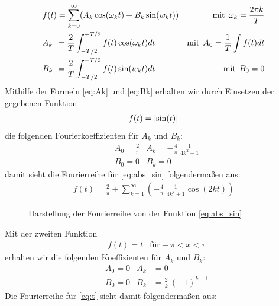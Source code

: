     \begin{align}   %
        &f(t) = \sum_{k=0}^{\infty} (A_k \cos(\omega_kt) + B_k \sin(w_kt))  &\text{mit} \:\: \omega_k = \frac{2\pi k}{T} \label{eq:frow}\\
        &A_k \hphantom{)} = \frac{2}{T} \int_{-T/2}^{+T/2} f(t) \cos(\omega_kt) dt  &\text{mit} \:\: A_0 = \frac{1}{T} \int f(t)dt \label{eq:Ak}\\
        &B_k \hphantom{)} = \frac{2}{T} \int_{-T/2}^{+T/2} f(t) \sin(w_kt) dt \!\!&\text{mit} \:\: B_0 = 0 \label{eq:Bk}
    \end{align}
    Mithilfe der Formeln \eqref{eq:Ak} und \eqref{eq:Bk} erhalten wir durch Einsetzen der gegebenen Funktion
    \begin{align}
        f(t) = \lvert\sin(t)\rvert \label{eq:abs_sin} 
    \end{align}
    die folgenden Fourierkoeffizienten für $A_k$ und $B_k$:
    \begin{align*}
        &A_0 = \frac{2}{\pi} &A_k = -\frac{4}{\pi}\:\frac{1}{4k^{2}-1}\\
        &B_0 = 0 &B_k = 0
    \end{align*}
    damit sieht die Fourierreihe für \eqref{eq:abs_sin} folgendermaßen aus:
    \begin{align}
        f(t)=\frac{2}{\pi}+\sum_{k=1}^{\infty} \left(-\frac{4}{\pi} \:\frac{1}{4k^2+1} \cos(2kt)\right)
    \end{align}
    \begin{figure}[h]
         \centering
           \vspace{-1.5em}
         \caption{Darstellung der Fourierreihe von der Funktion \eqref{eq:abs_sin}}
         \label{fig:sc_sin} 
    \end{figure}
    \newpage
    Mit der zweiten Funktion
    \begin{align}
        &f(t) = t &\text{für} -\pi < x < \pi \label{eq:t}
    \end{align}
    erhalten wir die folgenden Koeffizienten für $A_k$ und $B_k$:
    \begin{align*}
        &A_0 = 0 &A_k &= 0\\
        &B_0 = 0 &B_k &= \frac{2}{k}\:(-1)^{k+1}
    \end{align*}
    Die Fourierreihe für \eqref{eq:t} sieht damit folgendermaßen aus:

